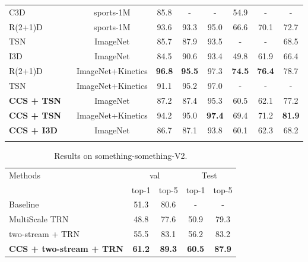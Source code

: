 \documentclass[conference,compsoc]{IEEEtran}
\begin{document}
\begin{table*}
\begin{center}
{\begin{tabular}{lccccccc}
         C3D \cite{tran2017convnet}~&sports-1M&85.8&- & - &54.9 &- & -\\
         R(2+1)D \cite{tran2018closer}~&sports-1M&93.6&93.3 & 95.0 &66.6 &70.1 & 72.7\\
         TSN \cite{wang2016temporal}~&ImageNet&85.7&87.9 & 93.5 &- &- & 68.5\\
         I3D \cite{carreira2017quo}~&ImageNet&84.5&90.6 & 93.4 &49.8 &61.9 & 66.4\\
         R(2+1)D \cite{tran2018closer}~&ImageNet+Kinetics& \textbf{96.8} & \textbf{95.5} & 97.3 & \textbf{74.5} & \textbf{76.4} & 78.7\\
         TSN \cite{wang2016temporal}~&ImageNet+Kinetics&91.1 & 95.2 & 97.0 &- &- & -\\
         \hline
         \textbf{CCS + TSN} ~&ImageNet & 87.2 & 87.4 & 95.3 & 60.5 & 62.1 & 77.2 \\
         \textbf{CCS + TSN} ~&ImageNet+Kinetics & 94.2 & 95.0 & \textbf{97.4} & 69.4 & 71.2 & \textbf{81.9} \\
         \textbf{CCS + I3D} ~&ImageNet & 86.7 & 87.1 & 93.8 & 60.1 & 62.3 & 68.2\\
\bottomrule
         \label{tab:compare}
      \end{tabular}
      }
   \end{center}
\end{table*}

\begin{table}
    \caption{Results on something-something-V2.}
\vspace{-3mm}
   \begin{center}
      \begin{tabular}{lcccc}
         \toprule
         \multirow{2}{*}{Methods}&
         \multicolumn{2}{c}{val}&
         \multicolumn{2}{c}{Test} \\
         &top-1&top-5&top-1&top-5\\
         \midrule
         Baseline & 51.3 & 80.6 & - & - \\
         MultiScale TRN & 48.8 & 77.6 & 50.9 & 79.3\\
         two-stream + TRN & 55.5 & 83.1 & 56.2 & 83.2\\
         \textbf{CCS + two-stream + TRN} & \textbf{61.2} &\textbf{89.3} & \textbf{60.5} & \textbf{87.9}\\
         \bottomrule
      \end{tabular}
   \end{center}
   \label{tab:something}
\end{table}
\end{document}
